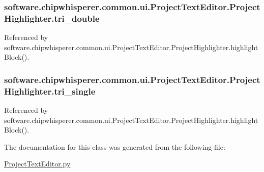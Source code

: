 \subsubsection[{tri\+\_\+double}]{\setlength{\rightskip}{0pt plus 5cm}software.\+chipwhisperer.\+common.\+ui.\+Project\+Text\+Editor.\+Project\+Highlighter.\+tri\+\_\+double}\label{classsoftware_1_1chipwhisperer_1_1common_1_1ui_1_1ProjectTextEditor_1_1ProjectHighlighter_a58d6253ebc44e23d7daa65b28e35ca69}


Referenced by software.\+chipwhisperer.\+common.\+ui.\+Project\+Text\+Editor.\+Project\+Highlighter.\+highlight\+Block().

\hypertarget{classsoftware_1_1chipwhisperer_1_1common_1_1ui_1_1ProjectTextEditor_1_1ProjectHighlighter_a7f3079f9c00c29c35f090685a2ed7cf4}{}
\subsubsection[{tri\+\_\+single}]{\setlength{\rightskip}{0pt plus 5cm}software.\+chipwhisperer.\+common.\+ui.\+Project\+Text\+Editor.\+Project\+Highlighter.\+tri\+\_\+single}\label{classsoftware_1_1chipwhisperer_1_1common_1_1ui_1_1ProjectTextEditor_1_1ProjectHighlighter_a7f3079f9c00c29c35f090685a2ed7cf4}


Referenced by software.\+chipwhisperer.\+common.\+ui.\+Project\+Text\+Editor.\+Project\+Highlighter.\+highlight\+Block().



The documentation for this class was generated from the following file\+:\begin{DoxyCompactItemize}
\item 
\hyperlink{ProjectTextEditor_8py}{Project\+Text\+Editor.\+py}\end{DoxyCompactItemize}
